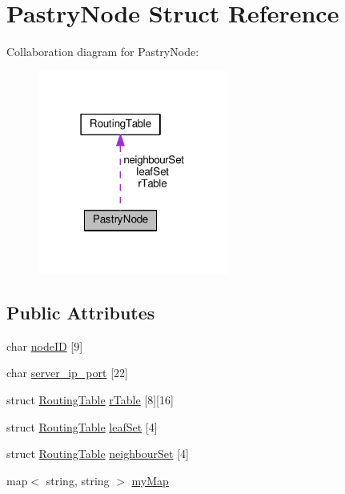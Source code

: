\hypertarget{structPastryNode}{\section{Pastry\-Node Struct Reference}
\label{structPastryNode}
}


Collaboration diagram for Pastry\-Node\-:
\nopagebreak
\begin{figure}[H]
\begin{center}
\leavevmode
\includegraphics[width=178pt]{structPastryNode__coll__graph}
\end{center}
\end{figure}
\subsection*{Public Attributes}
\begin{DoxyCompactItemize}
\item 
char \hyperlink{structPastryNode_a2d2056d1f2b89b7369d1b96a38c6a5ae}{node\-I\-D} \mbox{[}9\mbox{]}
\item 
char \hyperlink{structPastryNode_a810f7ecb9b6479076a6ef533382b6fe1}{server\-\_\-ip\-\_\-port} \mbox{[}22\mbox{]}
\item 
struct \hyperlink{structRoutingTable}{Routing\-Table} \hyperlink{structPastryNode_a6092d47e197f9df34a0b29613cd2a053}{r\-Table} \mbox{[}8\mbox{]}\mbox{[}16\mbox{]}
\item 
struct \hyperlink{structRoutingTable}{Routing\-Table} \hyperlink{structPastryNode_aa529c7f78df5bb37013eeb96a2f4f83d}{leaf\-Set} \mbox{[}4\mbox{]}
\item 
struct \hyperlink{structRoutingTable}{Routing\-Table} \hyperlink{structPastryNode_a89eba401351ef59d5892a47416b7b874}{neighbour\-Set} \mbox{[}4\mbox{]}
\item 
map$<$ string, string $>$ \hyperlink{structPastryNode_ac6fc5a45aefb40f056954664d4820423}{my\-Map}
\end{DoxyCompactItemize}


